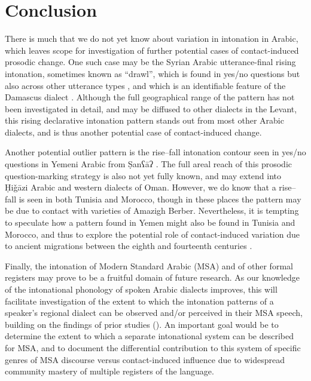 \documentclass[output=paper]{langsci/langscibook}
\begin{document}
\section{Conclusion} \label{closes}

There is much that we do not yet know about variation in intonation in Arabic, which leaves scope for investigation of further potential cases of contact-induced prosodic change. One such case may be the Syrian Arabic utterance-final rising intonation, sometimes known as ``drawl'', which is found in yes/no questions but also across other utterance types \citep{Cowell1964}, and which is an identifiable feature of the Damascus dialect \citep{KulkOdéWoidich2003}. Although the full geographical range of the pattern has not been investigated in detail, and may be diffused to other dialects in the Levant, this rising declarative intonation pattern stands out from most other Arabic dialects, and is thus another potential case of contact-induced change. 

Another potential outlier pattern is the rise--fall intonation contour seen in yes/no questions in Yemeni Arabic from Ṣanʕāʔ \citep{Hellmuth2014}. The full areal reach of this prosodic question-marking strategy is also not yet fully known, and may extend into Ḥiǧāzi Arabic and western dialects of Oman. However, we do know that a rise--fall is seen in both Tunisia and Morocco, though in these places the pattern may be due to contact with varieties of Amazigh Berber. Nevertheless, it is tempting to speculate how a pattern found in Yemen might also be found in Tunisia and Morocco, and thus to explore the potential role of contact-induced variation due to ancient migrations between the eighth and fourteenth centuries \citep{Holes2018}.

Finally, the intonation of Modern Standard Arabic (MSA) and of other formal registers may prove to be a fruitful domain of future research. As our knowledge of the intonational phonology of spoken Arabic dialects improves, this will facilitate investigation of the extent to which the intonation patterns of a speaker’s regional dialect can be observed and/or perceived in their MSA speech, building on the findings of prior studies (\citealt{ElZarkaHellmuth2009}). An important goal would be to determine the extent to which a separate intonational system can be described for MSA, and to document the differential contribution to this system of specific genres of MSA discourse versus contact-induced influence due to widespread community mastery of multiple registers of the language.  
\end{document}
